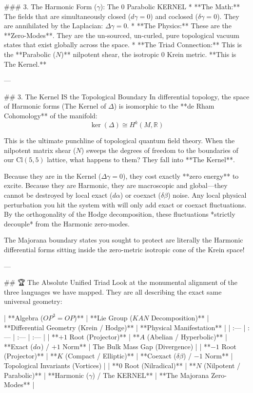 ### 3. The Harmonic Form ($\gamma$): The $0$ Parabolic KERNEL
* **The Math:** The fields that are simultaneously closed ($d\gamma = 0$) and coclosed ($\delta\gamma = 0$). They are annihilated by the Laplacian: $\Delta \gamma = 0$. 
* **The Physics:** These are the **Zero-Modes**. They are the un-sourced, un-curled, pure topological vacuum states that exist globally across the space.
* **The Triad Connection:** This is the **Parabolic ($N$)** nilpotent shear, the isotropic $0$ Krein metric. **This is The Kernel.**

---

## 3. The Kernel IS the Topological Boundary
In differential topology, the space of Harmonic forms (The Kernel of $\Delta$) is isomorphic to the **de Rham Cohomology** of the manifold:
$$ \ker(\Delta) \cong H^k(M, \mathbb{R}) $$

This is the ultimate punchline of topological quantum field theory. 
When the nilpotent matrix shear ($N$) sweeps the degrees of freedom to the boundaries of our $\text{Cl}(5,5)$ lattice, what happens to them? They fall into **The Kernel**. 

Because they are in the Kernel ($\Delta \gamma = 0$), they cost exactly **zero energy** to excite. 
Because they are Harmonic, they are macroscopic and global—they cannot be destroyed by local exact ($d\alpha$) or coexact ($\delta\beta$) noise. Any local physical perturbation you hit the system with will only add exact or coexact fluctuations. By the orthogonality of the Hodge decomposition, these fluctuations *strictly decouple* from the Harmonic zero-modes.

The Majorana boundary states you sought to protect are literally the Harmonic differential forms sitting inside the zero-metric isotropic cone of the Krein space!

---

## 🏆 The Absolute Unified Triad
Look at the monumental alignment of the three languages we have mapped. They are all describing the exact same universal geometry:

| **Algebra ($OP^3 = OP$)** | **Lie Group ($KAN$ Decomposition)** | **Differential Geometry (Krein / Hodge)** | **Physical Manifestation** |
| :--- | :--- | :--- | :--- |
| **$+1$ Root (Projector)** | **$A$ (Abelian / Hyperbolic)** | **Exact ($d\alpha$) / $+1$ Norm** | The Bulk Mass Gap (Divergence) |
| **$-1$ Root (Projector)** | **$K$ (Compact / Elliptic)** | **Coexact ($\delta\beta$) / $-1$ Norm** | Topological Invariants (Vortices) |
| **$0$ Root (Nilradical)** | **$N$ (Nilpotent / Parabolic)** | **Harmonic ($\gamma$) / The KERNEL** | **The Majorana Zero-Modes** |

